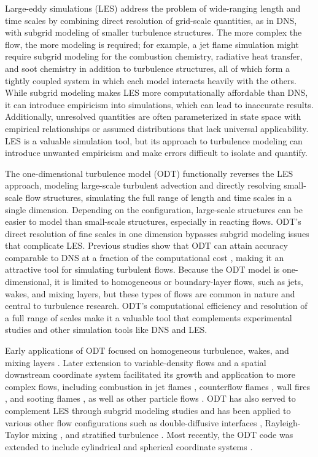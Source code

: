 \documentclass[preprint,12pt, a4paper]{elsarticle}
\begin{document}
Large-eddy simulations (LES) address the problem of wide-ranging length and time scales by combining  direct resolution of grid-scale quantities, as in DNS, with subgrid modeling of smaller turbulence structures. The more complex the flow, the more modeling is required; for example, a jet flame simulation might require subgrid modeling for the combustion chemistry, radiative heat transfer, and soot chemistry in addition to turbulence structures, all of which form a tightly coupled system in which each model interacts heavily with the others. While subgrid modeling makes LES more computationally affordable than DNS, it can introduce empiricism into simulations, which can lead to inaccurate results. Additionally, unresolved quantities are often parameterized in state space with empirical relationships or assumed distributions that lack universal applicability. LES is a valuable simulation tool, but its approach to turbulence modeling can introduce unwanted empiricism and make errors difficult to isolate and quantify.

The one-dimensional turbulence model (ODT) functionally reverses the LES approach, modeling large-scale turbulent advection and directly resolving small-scale flow structures, simulating the full range of length and time scales in a single dimension. Depending on the configuration, large-scale structures can be easier to model than small-scale structures, especially in reacting flows. ODT's direct resolution of fine scales in one dimension bypasses subgrid modeling issues that complicate LES. Previous studies show that ODT can attain accuracy comparable to DNS at a fraction of the computational cost \cite{Lignell_2015,Abboud_2015}, making it an attractive tool for simulating turbulent flows. Because the ODT model is one-dimensional, it is limited to homogeneous or boundary-layer flows, such as jets, wakes, and mixing layers, but these types of flows are common in nature and central to turbulence research. ODT's computational efficiency and resolution of a full range of scales make it a valuable tool that complements experimental studies and other simulation tools like DNS and LES. 

Early applications of ODT focused on homogeneous turbulence, wakes, and mixing layers \cite{Kerstein_1999,Kerstein_2000,Kerstein_2001}. Later extension to variable-density flows and a spatial downstream coordinate system facilitated its growth and application to more complex flows, including combustion in jet flames \cite{Echekki_2001,Hewson_2001,Hewson_2002,Lignell_2012,Punati_2011,Abdelsamie_2017,Lignell_2017, Goshayeshi_2015}, counterflow flames \cite{Jozefik_2015}, wall fires \cite{Monson_2016}, and sooting flames \cite{Lignell_2015,Hewson_2006,Hewson_2009,Lignell_2015b,Ricks_2010}, as well as other particle flows \cite{Sun_2017,Schmidt_2009,Sun_2014,Fistler_2017}. ODT has also served to complement LES through subgrid modeling studies \cite{Cao_2008,Schmidt_2003,Schmidt_2010} and has been applied to various other flow configurations such as double-diffusive interfaces \cite{GonzalezJuez_2011}, Rayleigh-Taylor mixing \cite{GonzalezJuez_2013}, and stratified turbulence \cite{Wunsch_2001}. Most recently, the ODT code was extended to include cylindrical and spherical coordinate systems \cite{Lignell_2018,Klein_2018,Klein_2019}.
\end{document}
